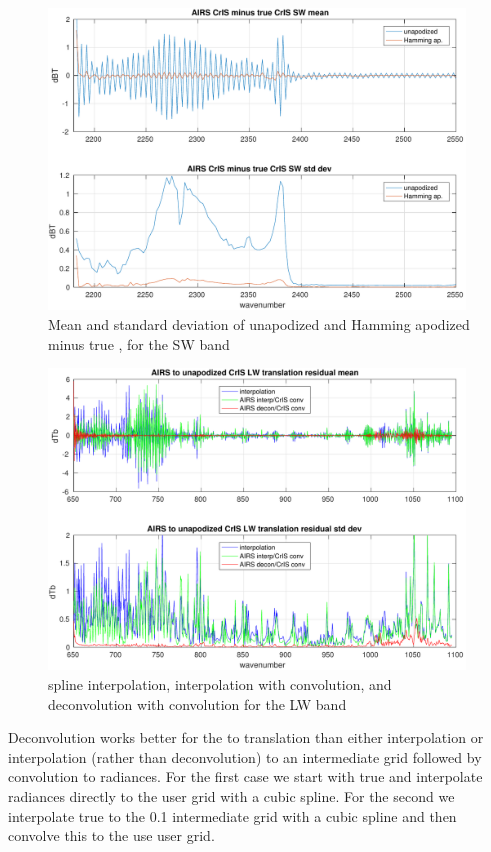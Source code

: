 \documentclass[12pt]{article}
\begin{document}
\begin{figure} %
  \centering
  \includegraphics[height=8cm]{figures/a2cris_diff_SW.pdf}
  \caption{Mean and standard deviation of unapodized and Hamming
    apodized {\airs} {\cris} minus true {\cris}, for the {\cris} SW
    band}
  \label{aclwd}
\end{figure}

\begin{figure} %
  \centering
  \includegraphics[height=8cm]{figures/a2cris_interp_LW.pdf}
  \caption{spline interpolation, interpolation with convolution, 
    and deconvolution with convolution for the {\cris} LW band}
  \label{intpLW}
\end{figure}

Deconvolution works better for the {\airs} to {\cris} 
translation than either interpolation or interpolation (rather than
deconvolution) to an intermediate grid followed by convolution to
{\cris} radiances.  For the first case we start with true {\airs} and
interpolate radiances directly to the {\cris} user grid with a cubic
spline.  For the second we interpolate true {\airs} to the 0.1 {\wn}
intermediate grid with a cubic spline and then convolve this to the
use {\cris} user grid.
\end{document}
